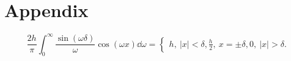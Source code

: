 
\clearpage
\section{Appendix}

\begin{equation}
    \frac{2h}{\pi}\int_{0}^{\infty}\frac{\sin\left( \omega\delta \right)}{\omega}
            \cos\left( \omega x \right) \dd\omega = 
            \begin{cases}
                    h, \ \left| x \right| < \delta, 
                    \frac{h}{2}, \ x = \pm \delta, 
                    0, \ \left| x \right| > \delta.
            \end{cases}
    \end{equation}
